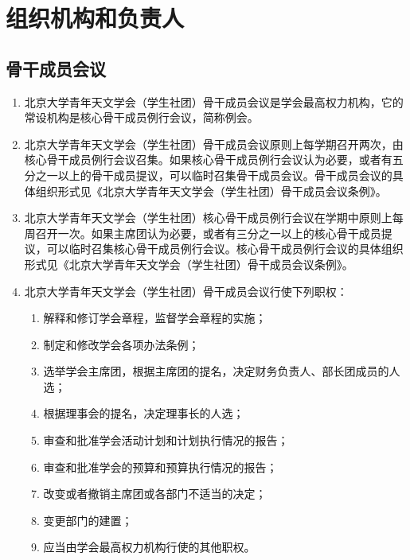 \section{组织机构和负责人}

\subsection{骨干成员会议}

\begin{enumerate}[resume]
    \item 北京大学青年天文学会（学生社团）骨干成员会议是学会最高权力机构，它的常设机构是核心骨干成员例行会议，简称例会。

    \item 北京大学青年天文学会（学生社团）骨干成员会议原则上每学期召开两次，由核心骨干成员例行会议召集。如果核心骨干成员例行会议认为必要，或者有五分之一以上的骨干成员提议，可以临时召集骨干成员会议。骨干成员会议的具体组织形式见《北京大学青年天文学会（学生社团）骨干成员会议条例》。
    
    \item 北京大学青年天文学会（学生社团）核心骨干成员例行会议在学期中原则上每周召开一次。如果主席团认为必要，或者有三分之一以上的核心骨干成员提议，可以临时召集核心骨干成员例行会议。核心骨干成员例行会议的具体组织形式见《北京大学青年天文学会（学生社团）骨干成员会议条例》。
    
    \item 北京大学青年天文学会（学生社团）骨干成员会议行使下列职权：
    
    \begin{enumerate}
        \item 解释和修订学会章程，监督学会章程的实施；
        \item 制定和修改学会各项办法条例；
        \item 选举学会主席团，根据主席团的提名，决定财务负责人、部长团成员的人选；
        \item 根据理事会的提名，决定理事长的人选；
        \item 审查和批准学会活动计划和计划执行情况的报告；
        \item 审查和批准学会的预算和预算执行情况的报告；
        \item 改变或者撤销主席团或各部门不适当的决定；
        \item 变更部门的建置；
        \item 应当由学会最高权力机构行使的其他职权。
    \end{enumerate}
    

\end{enumerate}
